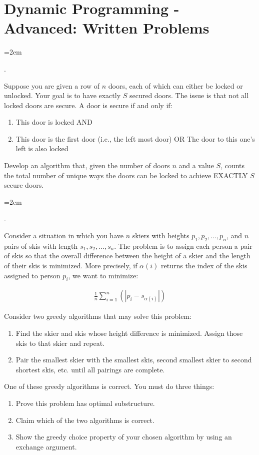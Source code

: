 \documentclass[12pt]{article}
\def\homework{Dynamic Programming - Advanced: Written Problems}
\newcounter{quesnum}
\newcommand{\question}[2][??]{
\begin{list}{\labelitemi}{\leftmargin=2em}
\item [\arabic{quesnum}.]  {#2}
\end{list}
\addtocounter{quesnum}{1}
}
\newcommand{\answer}[2][??]{ 
\ifthenelse{\boolean{solution}}{
\color{red} #2 \color{black}}
{\vspace*{#1}}
}
\begin{document}
\section*{\homework}



\question[3]{
Suppose you are given a row of $n$ doors, each of which can either be locked or unlocked. Your goal is to have exactly $S$ secured doors. The issue is that not all locked doors are secure. A door is secure if and only if:

\begin{enumerate}
\item This door is locked AND
\item This door is the first door (i.e., the left most door) OR The door to this one's left is also locked
\end{enumerate}

Develop an algorithm that, given the number of doors $n$ and a value $S$, counts the total number of unique ways the doors can be locked to achieve EXACTLY $S$ secure doors.
}

\answer[0 in]{
...
}



\question[2]{
Consider a situation in which you have $n$ skiers with heights $p_1,p_2,...,p_n$, and $n$ pairs of skis with length $s_1,s_2,...,s_n$. The problem is to assign each person a pair of skis so that the overall difference between the height of a skier and the length of their skis is minimized. More precisely, if $\alpha(i)$ returns the index of the skis assigned to person $p_i$, we want to minimize:

\begin{align*}
\frac{1}{n}\sum_{i=1}^{n}(|p_i - s_{\alpha(i)}|)
\end{align*}

Consider two greedy algorithms that may solve this problem:

\begin{enumerate}
\item Find the skier and skis whose height difference is minimized. Assign those skis to that skier and repeat.
\item Pair the smallest skier with the smallest skis, second smallest skier to second shortest skis, etc. until all pairings are complete.
\end{enumerate}

One of these greedy algorithms is correct. You must do three things:

\begin{enumerate}
\item Prove this problem has optimal substructure.
\item Claim which of the two algorithms is correct.
\item Show the greedy choice property of your chosen algorithm by using an exchange argument.
\end{enumerate}
}
\end{document}
